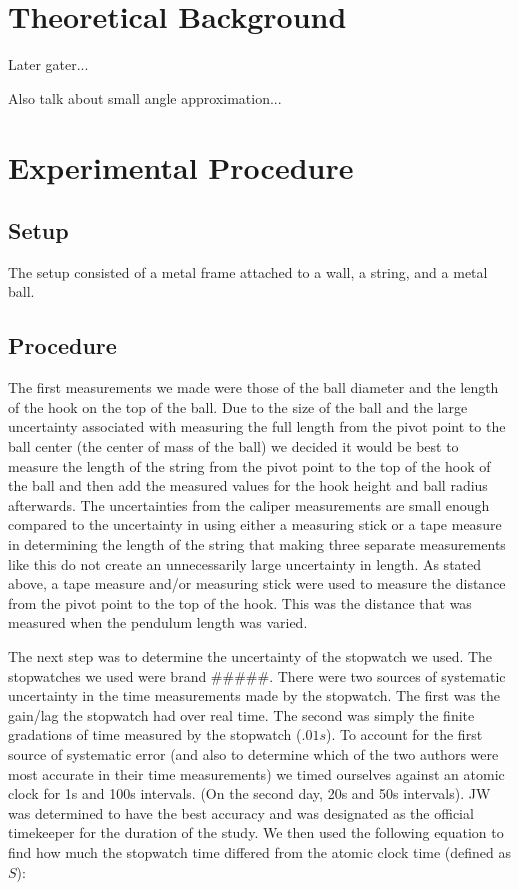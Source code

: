 \documentclass[iop,numberedappendix,appendixfloats]{emulateapj}
\begin{document}
\section{Theoretical Background}
\label{sec:theory}


Later gater...

Also talk about small angle approximation...






\section{Experimental Procedure}
\label{sec:procedure}

\subsection{Setup}

The setup consisted of a metal frame attached to a wall, a string, and a metal 
ball.

\subsection{Procedure}

The first measurements we made were those of the ball diameter and the length 
of the hook on the top of the ball.  Due to the size of 
the ball and the large uncertainty associated with measuring the full length 
from the pivot point to the ball center (the center of mass of the
ball) we decided it would be best to measure the length of the string from the
pivot point to the top of the hook of the ball and then add the measured values 
for the hook height and ball radius afterwards.  The uncertainties from the 
caliper measurements are small enough compared to the uncertainty in using 
either a measuring stick or a tape measure in determining the length of the
string that making three separate measurements like this do not create an 
unnecessarily large uncertainty in length.  As stated above, a tape measure 
and/or measuring stick were used to measure the distance from the pivot point
to the top of the hook.  This was the distance that was measured when the
pendulum length was varied.

The next step was to determine the uncertainty of the stopwatch we used.  The
stopwatches we used were brand \#\#\#\#\#.  There were two sources of systematic 
uncertainty in the time measurements made by the stopwatch.  The first was the 
gain/lag the stopwatch had over real time.  The second was simply the finite 
gradations of time measured by the stopwatch ($.01 s$).  To account for the 
first source of systematic error (and also to determine which of the two 
authors were most accurate in their time measurements) we timed 
ourselves against an atomic clock for 1s and 100s intervals.  (On the second
day, 20s and 50s intervals). JW 
was determined to have the best accuracy and was 
designated as the official timekeeper for the duration of the study.  
We then used the following equation to find how much the stopwatch time
differed from the atomic clock time (defined as $S$):
\end{document}

